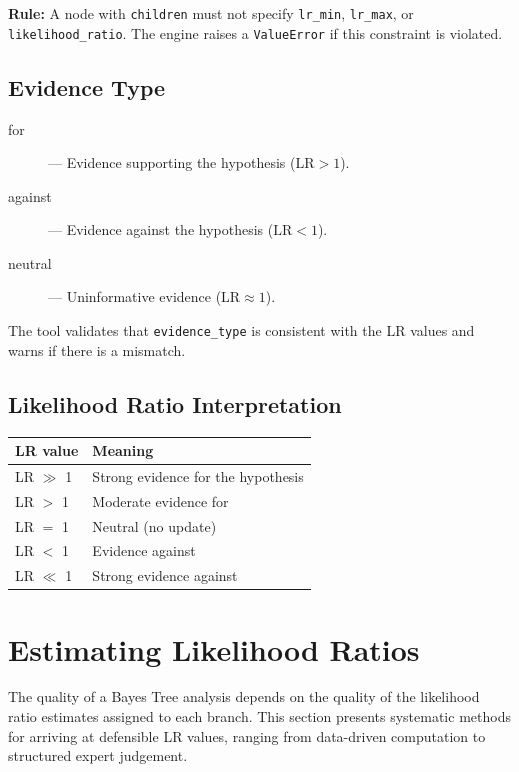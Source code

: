 \documentclass[11pt,a4paper]{article}
\begin{document}
\textbf{Rule:} A node with \texttt{children} must not specify
\texttt{lr\_min}, \texttt{lr\_max}, or \texttt{likelihood\_ratio}.  The
engine raises a \texttt{ValueError} if this constraint is violated.

\subsection{Evidence Type}

\begin{description}
\item[for] --- Evidence supporting the hypothesis ($\text{LR} > 1$).
\item[against] --- Evidence against the hypothesis ($\text{LR} < 1$).
\item[neutral] --- Uninformative evidence ($\text{LR} \approx 1$).
\end{description}

The tool validates that \texttt{evidence\_type} is consistent with the LR
values and warns if there is a mismatch.

\subsection{Likelihood Ratio Interpretation}

\begin{center}
\begin{tabular}{ll}
\hline
\textbf{LR value} & \textbf{Meaning} \\
\hline
LR $\gg$ 1 & Strong evidence for the hypothesis \\
LR $>$ 1   & Moderate evidence for \\
LR $=$ 1   & Neutral (no update) \\
LR $<$ 1   & Evidence against \\
LR $\ll$ 1 & Strong evidence against \\
\hline
\end{tabular}
\end{center}

\section{Estimating Likelihood Ratios}
\label{sec:estimating-lr}

The quality of a Bayes Tree analysis depends on the quality of the likelihood
ratio estimates assigned to each branch. This section presents systematic
methods for arriving at defensible LR values, ranging from data-driven
computation to structured expert judgement.
\end{document}
